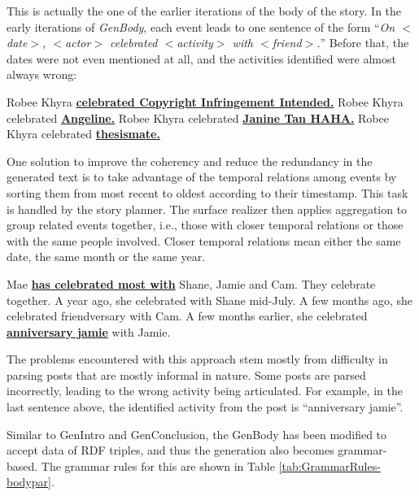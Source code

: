This is actually the one of the earlier iterations of the body of the story. In the early iterations of \textit{GenBody}, each event leads to one sentence of the form ``\textit{On $<$date$>$, $<$actor$>$ celebrated $<$activity$>$ with $<$friend$>$.}” Before that, the dates were not even mentioned at all, and the activities identified were almost always wrong:

\begin{center} Robee Khyra \underline{\textbf{celebrated Copyright Infringement Intended.}} Robee Khyra celebrated \underline{\textbf{Angeline.}} Robee Khyra celebrated \underline{\textbf{Janine Tan HAHA.}} Robee Khyra celebrated \underline{\textbf{thesismate.}} \end{center}

One solution to improve the coherency and reduce the redundancy in the generated text is to take advantage of the temporal relations among events by sorting them from most recent to oldest according to their timestamp. This task is handled by the story planner. The surface realizer then applies aggregation to group related events together, i.e., those with closer temporal relations or those with the same people involved. Closer temporal relations mean either the same date, the same month or the same year.

Mae \underline{\textbf{has celebrated most with}} Shane, Jamie and Cam. They celebrate together. A year ago, she celebrated with Shane mid-July. A few months ago, she celebrated friendversary with Cam. A few months earlier, she celebrated \underline{\textbf{anniversary jamie}} with Jamie.

The problems encountered with this approach stem mostly from difficulty in parsing posts that are mostly informal in nature. Some posts are parsed incorrectly, leading to the wrong activity being articulated. For example, in the last sentence above, the identified activity from the post is “anniversary jamie”.

Similar to GenIntro and GenConclusion, the GenBody has been modified to accept data of RDF triples, and thus the generation also becomes grammar-based. The grammar rules for this are shown in Table \ref{tab:GrammarRules-bodypar}.

